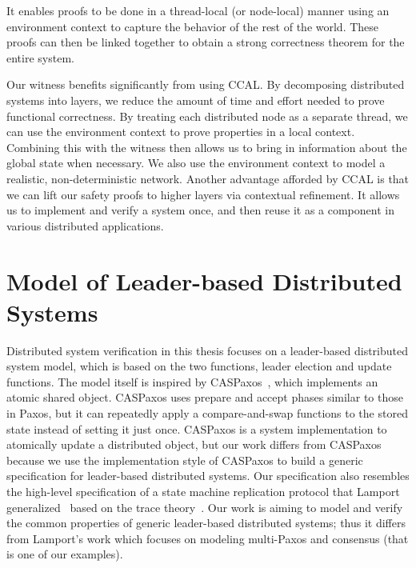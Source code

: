 It enables proofs to be done in a thread-local (or node-local) manner using an environment context to
capture the behavior of the rest of the world.
These proofs can then be linked together to obtain a strong correctness theorem for the entire system.

Our witness benefits significantly from using CCAL.
By decomposing distributed systems into layers, we reduce the amount of time and effort needed to
prove functional correctness.
By treating each distributed node as a separate thread, we can use the environment context to
prove properties in a local context.
Combining this with the witness then allows us to bring in information about the global state when necessary.
We also use the environment context to model a realistic, non-deterministic network.
Another advantage afforded by CCAL is that we can lift our safety proofs to higher layers via contextual refinement.
It allows us to implement and verify a system once, and then reuse it as a component in various distributed applications.



\section{Model of Leader-based Distributed Systems}
\label{chatper:related:sec:model-of-leader-based-distributed-systems}

Distributed system verification in this thesis focuses on a leader-based distributed system model, 
which is based on the two functions,
leader election and update functions. 
The model itself is inspired by CASPaxos~\cite{caspaxos},
which implements an atomic shared object. 
CASPaxos uses prepare and accept
phases similar to those in Paxos, but it can repeatedly apply a compare-and-swap
functions to the stored state instead of setting it just once. 
CASPaxos is a system implementation
to atomically update a distributed object, but our work differs from CASPaxos 
because we use the implementation style of
CASPaxos to build a generic specification for leader-based distributed systems.
Our specification also resembles the high-level specification of a state machine
replication protocol that Lamport generalized~\cite{generalizedconsensus} based on the trace theory~\cite{mazurkiewicz:tracetheory}.
Our work is aiming to model and verify the common properties of  generic leader-based distributed systems;
thus it differs from Lamport's work which focuses on modeling multi-Paxos and consensus (that is one of our examples).

